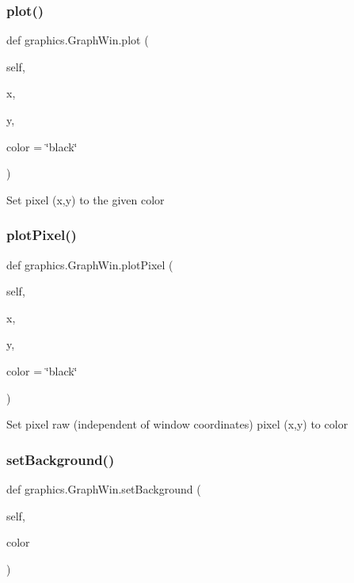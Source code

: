 \subsubsection{\texorpdfstring{plot()}{plot()}}
{\footnotesize\ttfamily def graphics.\+Graph\+Win.\+plot (\begin{DoxyParamCaption}\item[{}]{self,  }\item[{}]{x,  }\item[{}]{y,  }\item[{}]{color = {\ttfamily \char`\"{}black\char`\"{}} }\end{DoxyParamCaption})}

\begin{DoxyVerb}Set pixel (x,y) to the given color\end{DoxyVerb}
 \mbox{\label{classgraphics_1_1_graph_win_a66ef7f9b272d4ef482f834855ccfa0c4}} 
\subsubsection{\texorpdfstring{plot\+Pixel()}{plotPixel()}}
{\footnotesize\ttfamily def graphics.\+Graph\+Win.\+plot\+Pixel (\begin{DoxyParamCaption}\item[{}]{self,  }\item[{}]{x,  }\item[{}]{y,  }\item[{}]{color = {\ttfamily \char`\"{}black\char`\"{}} }\end{DoxyParamCaption})}

\begin{DoxyVerb}Set pixel raw (independent of window coordinates) pixel
(x,y) to color\end{DoxyVerb}
 \mbox{\label{classgraphics_1_1_graph_win_aec4e7921def91d795367eef63054a4df}} 
\subsubsection{\texorpdfstring{set\+Background()}{setBackground()}}
{\footnotesize\ttfamily def graphics.\+Graph\+Win.\+set\+Background (\begin{DoxyParamCaption}\item[{}]{self,  }\item[{}]{color }\end{DoxyParamCaption})}

